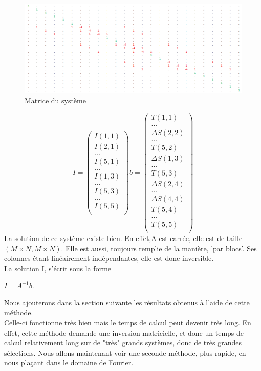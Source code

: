 \begin{figure}[!htb]
\includegraphics[scale=0.5]{Images/matrice.png}
\caption{Matrice du système}
\end{figure}
\begin{equation}
I = 
\begin{pmatrix}
I(1,1)\\
I(2,1)\\
...\\
I(5,1)\\
...\\
I(1,3)\\
...\\
I(5,3)\\
...\\
I(5,5)\\
\end{pmatrix}
b = 
\begin{pmatrix}
T(1,1)\\
...\\
\Delta S(2,2)\\
...\\
T(5,2)\\
\Delta S(1,3)\\
...\\
T(5,3)\\
\Delta S(2,4)\\
...\\
\Delta S(4,4)\\
T(5,4)\\
...\\
T(5,5)\\
\end{pmatrix}
\end{equation}
La solution de ce système existe bien. En effet,A est carrée, elle est de taille $\left(M\times N, M \times N\right)$. Elle est aussi, toujours remplie de la manière, 'par blocs'. Ses colonnes étant linéairement indépendantes, elle est donc inversible.\\
La solution I, s'écrit sous la forme
\begin{center}
$I = A^{-1}b$.
\end{center} 
Nous ajouterons dans la section suivante les résultats obtenus à l'aide de cette méthode. \\ Celle-ci fonctionne très bien mais le temps de calcul peut devenir très long. En effet, cette méthode demande une inversion matricielle, et donc un temps de calcul relativement long sur de "très" grands systèmes, donc de très grandes sélections. Nous allons maintenant voir une seconde méthode, plus rapide, en nous plaçant dans le domaine de Fourier.

